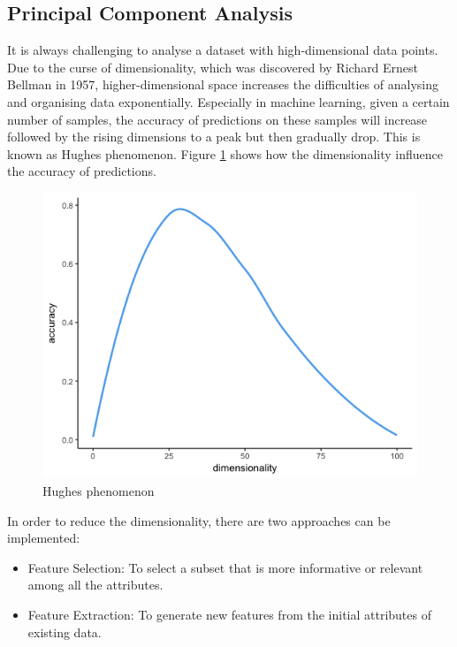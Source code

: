 \documentclass[11pt]{article} %
\theoremstyle{plain}
\theoremstyle{definition}
\begin{document}
\subsection{Principal Component Analysis}

It is always challenging to analyse a dataset with high-dimensional data points. Due to the curse of dimensionality, which was discovered by Richard Ernest Bellman in 1957, higher-dimensional space increases the difficulties of analysing and organising data exponentially\cite{keogh/cod:2017}. Especially in machine learning, given a certain number of samples, the accuracy of predictions on these samples will increase followed by the rising dimensions to a peak but then gradually drop. This is known as Hughes phenomenon\cite{hughes/itoit:1968}. Figure \ref{fig:hughes} shows how the dimensionality influence the accuracy of predictions.

\begin{figure}[ht]
  \includegraphics[width=0.8\linewidth, center]{resources/dimensionality.png}
  \caption{Hughes phenomenon}
  \label{fig:hughes}
\end{figure}

In order to reduce the dimensionality, there are two approaches can be implemented:
\begin{itemize}
  \item Feature Selection: To select a subset that is more informative or relevant among all the attributes\cite{hastie/etal:2009}.
  \item Feature Extraction: To generate new features from the initial attributes of existing data\cite{wiki/fs:2018}.
\end{itemize}
\end{document}
